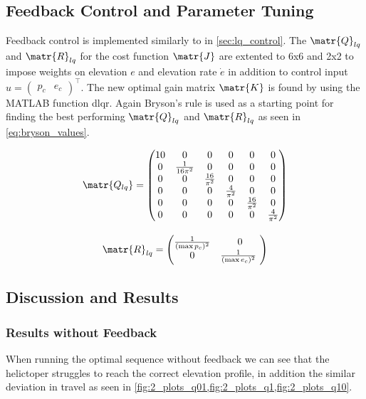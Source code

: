 \subsection{Feedback Control and Parameter Tuning}
Feedback control is implemented similarly to in \cref{sec:lq_control}. The $\matr{Q}_{lq}$ and $\matr{R}_{lq}$ for the cost function $\matr{J}$ are extented to 6x6 and 2x2 to impose weights on elevation $e$ and elevation rate $\dot{e}$ in addition to control input $u = \begin{pmatrix} p_c & e_c \end{pmatrix}^\top$. The new optimal gain matrix $\matr{K}$ is found by using the MATLAB function dlqr. Again Bryson's rule is used as a starting point for finding the best performing $\matr{Q}_{lq}$ and $\matr{R}_{lq}$ as seen in \cref{eq:bryson_values}.

\begin{subequations}\label{eq:bryson_values}
    \begin{gather}
    \matr{Q_{lq}}=
    \begin{pmatrix}
    10 & 0 & 0 & 0 & 0 & 0\\
    0 & \frac{1}{16\pi^2} & 0 & 0 & 0 & 0 \\
    0 & 0 & \frac{16}{\pi^2} & 0 & 0 & 0 \\
    0 & 0 & 0 & \frac{4}{\pi^2} & 0 & 0 \\
    0 & 0 & 0 & 0 & \frac{16}{\pi^2} & 0 \\
    0 & 0 & 0 & 0 & 0 & \frac{4}{\pi^2}
    \end{pmatrix} \\[0.35cm]
    \matr{R}_{lq}=
    \begin{pmatrix}
        \frac{1}{(\max p_c)^2} & 0 \\
        0 & \frac{1}{(\max e_c)^2} \
    \end{pmatrix}
    \end{gather}
\end{subequations}



\subsection{Discussion and Results}
\subsubsection{Results without Feedback}
When running the optimal sequence without feedback we can see that the helictoper struggles to reach the correct elevation profile, in addition the similar deviation in travel as seen in \cref{fig:2_plots_q01,fig:2_plots_q1,fig:2_plots_q10}.

